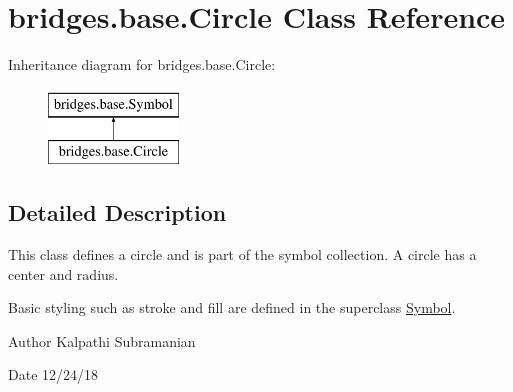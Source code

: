 \hypertarget{classbridges_1_1base_1_1_circle}{}\section{bridges.\+base.\+Circle Class Reference}
\label{classbridges_1_1base_1_1_circle}
Inheritance diagram for bridges.\+base.\+Circle\+:\begin{figure}[H]
\begin{center}
\leavevmode
\includegraphics[height=2.000000cm]{classbridges_1_1base_1_1_circle}
\end{center}
\end{figure}


\subsection{Detailed Description}
This class defines a circle and is part of the symbol collection. A circle has a center and radius. 

Basic styling such as stroke and fill are defined in the superclass \hyperlink{classbridges_1_1base_1_1_symbol}{Symbol}.

\begin{DoxyAuthor}{Author}
Kalpathi Subramanian 
\end{DoxyAuthor}
\begin{DoxyDate}{Date}
12/24/18 
\end{DoxyDate}
